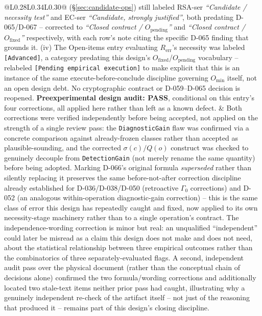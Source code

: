 \documentclass[11pt,a4paper]{article}
\begin{document}
\begin{longtable}{@{}L{0.28\textwidth}L{0.34\textwidth}L{0.30\textwidth}@{}}
(\S\ref{sec:candidate-ops}) still labeled RSA-ser \emph{``Candidate / necessity test''} and EC-ser \emph{``Candidate, strongly justified''}, both predating D-065/D-067 -- corrected to \emph{``Closed contract / $O_{\text{pending}}$''} and \emph{``Closed contract / $O_{\text{fixed}}$''} respectively, with each row's note citing the specific D-065 finding that grounds it. (iv) The Open-items entry evaluating $R_{\text{err}}$'s necessity was labeled \texttt{[Advanced]}, a category predating this design's $O_{\text{fixed}}$/$O_{\text{pending}}$ vocabulary -- relabeled \texttt{[Pending empirical execution]} to make explicit that this is an instance of the same execute-before-conclude discipline governing $O_{\min}$ itself, not an open design debt. No cryptographic contract or D-059--D-065 decision is reopened. \textbf{Preexperimental design audit: PASS}, conditional on this entry's four corrections, all applied here rather than left as a known defect. & Both corrections were verified independently before being accepted, not applied on the strength of a single review pass: the \texttt{DiagnosticGain} flaw was confirmed via a concrete comparison against already-frozen classes rather than accepted as plausible-sounding, and the corrected $\sigma(c)/Q(o)$ construct was checked to genuinely decouple from \texttt{DetectionGain} (not merely rename the same quantity) before being adopted. Marking D-066's original formula \emph{superseded} rather than silently replacing it preserves the same before-not-after correction discipline already established for D-036/D-038/D-050 (retroactive $\Gamma_0$ corrections) and D-052 (an analogous within-operation diagnostic-gain correction) -- this is the same class of error this design has repeatedly caught and fixed, now applied to its own necessity-stage machinery rather than to a single operation's contract. The independence-wording correction is minor but real: an unqualified ``independent'' could later be misread as a claim this design does not make and does not need, about the statistical relationship between three empirical outcomes rather than the combinatorics of three separately-evaluated flags. A second, independent audit pass over the physical document (rather than the conceptual chain of decisions alone) confirmed the two formula/wording corrections and additionally located two stale-text items neither prior pass had caught, illustrating why a genuinely independent re-check of the artifact itself -- not just of the reasoning that produced it -- remains part of this design's closing discipline.\\

\end{longtable}
\end{document}
